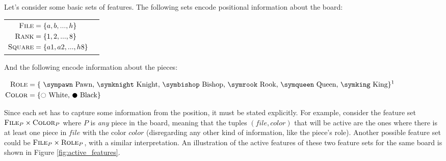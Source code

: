 Let's consider some basic sets of features. The following sets encode positional information about the board:

\begin{center}
\begin{tabular}{cc}

$\begin{aligned}[t]
\textsc{File} &= \{a, b, ..., h\} \\
\textsc{Rank} &= \{1, 2, ..., 8\} \\
\textsc{Square} &= \{a1, a2, ..., h8\}
\end{aligned}$

&

\raisebox{-10ex}{
\chessboard[
    tinyboard,
    showmover=false,
    pgfstyle={text},
    text=\fontsize{1.2ex}{1.2ex}\bfseries\sffamily \currentwq,
    markboard
]
}

\end{tabular}
\end{center}

And the following encode information about the pieces:

\begin{center}
$\begin{aligned}[t]
\featureset{Role} &= \text{\{
    \sympawn\ Pawn,
    \symknight\ Knight,
    \symbishop\ Bishop,
    \symrook\ Rook,
    \symqueen\ Queen,
    \symking\ King\}}\textsuperscript{1} \\
\featureset{Color} &= \text{\{\white\ White, \black\ Black\}}
\end{aligned}$
\end{center}

Since each set has to capture some information from the position, it must be stated explicitly. For example, consider the feature set $\textsc{File}_{P} \times \textsc{Color}_{P}$ where $P$ is \textit{any} piece in the board, meaning that the tuples $(file, color)$ that will be active are the ones where there is at least one piece in $file$ with the color $color$ (disregarding any other kind of information, like the piece's role). Another possible feature set could be $\textsc{File}_{P} \times \textsc{Role}_{P}$, with a similar interpretation. An illustration of the active features of these two feature sets for the same board is shown in Figure \ref{fig:active_features}.

